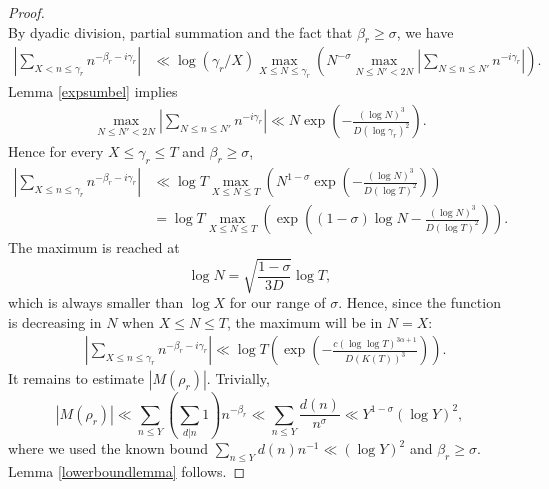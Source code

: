 \documentclass[reqno]{amsart}
\numberwithin{equation}{section}
\theoremstyle{remark}
\begin{document}
\begin{proof}
\begin{equation*}
\end{equation*}
By dyadic division, partial summation and the fact that $\beta_r\ge \sigma$, we have
\begin{align*}
     \left|\sum_{X< n\le \gamma_r}n^{-\beta_r-i\gamma_r}\right|&\ll \log(\gamma_r/X)\max_{X\le N\le \gamma_r}\left(N^{-\sigma}\max_{N\le N'<2N}\left|\sum_{N\le n\le N'}n^{-i\gamma_r}\right|\right).
    \end{align*}
Lemma \ref{expsumbel} implies 
\begin{align*}
   \max_{N\le N'<2N}\left|\sum_{N\le n\le N'}n^{-i\gamma_r}\right|\ll  N\exp\left(-\frac{(\log N)^3}{D(\log \gamma_r)^2}\right).
\end{align*}
Hence for every $X\le \gamma_r\le T$ and $\beta_r\ge \sigma$,
\begin{align*}
    \left|\sum_{X\le n\le \gamma_r}n^{-\beta_r-i\gamma_r}\right|&\ll \log T\max_{X\le N\le T}\left(N^{1-\sigma}\exp\left(-\frac{(\log N)^3}{D (\log T)^2}\right)\right)\\
    &= \log T\max_{X\le N\le T}\left(\exp\left((1-\sigma)\log N-\frac{(\log N)^3}{D(\log T)^2}\right)\right).
\end{align*}
The maximum is reached at
\[
\log N=\sqrt{\frac{1-\sigma}{3D}}\log T,
\]
which is always smaller than $\log X$ for our range of $\sigma$. Hence, since the function is decreasing in $N$ when $X\le N\le T$, the maximum will be in $N=X$:
\begin{equation}\label{kvlowerbound}
        \begin{aligned}
    &\left|\sum_{X\le n\le \gamma_r}n^{-\beta_r-i\gamma_r}\right|\ll \log T\left(\exp\left(-\frac{c(\log\log T)^{3\alpha+1}}{D(K(T))^3}\right)\right).
\end{aligned}
\end{equation}
It remains to estimate $|M(\rho_r)|$. Trivially,
\begin{equation}
    |M(\rho_r)|\ll \sum_{n\le Y}\left(\sum_{d|n}1\right)n^{-\beta_r}\ll \sum_{n\le Y}\frac{d(n)}{n^{\sigma}}\ll Y^{1-\sigma}(\log Y)^2,
\end{equation}
where we used the known bound $\sum_{n\le Y}d(n)n^{-1}\ll (\log Y)^2$ and $\beta_r\ge \sigma$.
Lemma \ref{lowerboundlemma} follows.
\end{proof}
\end{document}
